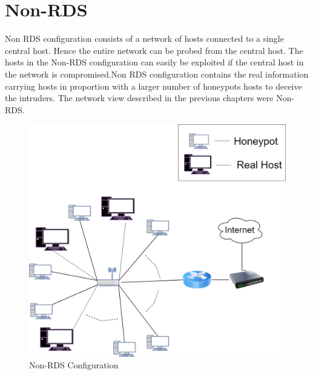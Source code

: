 \section{Non-RDS}
Non RDS configuration consists of a network of hosts connected to a single central host. Hence the entire network can be probed from the central host. The hosts in the Non-RDS configuration can easily be exploited if the central host in the network is compromised.Non RDS configuration contains the real information carrying hosts in proportion with a larger number of honeypots hosts to deceive the
intruders. The network view described in the previous chapters were Non-RDS.
   \FloatBarrier
    \begin{figure}[!htbp]
    \centering
      \includegraphics[scale=0.2]{Chap4/Non-RDS.png}
      \caption{Non-RDS Configuration}\label{fig:figure15}
    \end{figure} 



